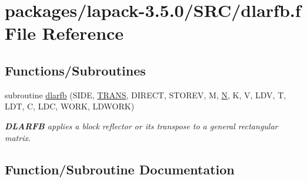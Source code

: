 \hypertarget{dlarfb_8f}{}\section{packages/lapack-\/3.5.0/\+S\+R\+C/dlarfb.f File Reference}
\label{dlarfb_8f}
\subsection*{Functions/\+Subroutines}
\begin{DoxyCompactItemize}
\item 
subroutine \hyperlink{dlarfb_8f_a83c81583bd444e0cf021fb006cd9a5e8}{dlarfb} (S\+I\+D\+E, \hyperlink{superlu__enum__consts_8h_a0c4e17b2d5cea33f9991ccc6a6678d62a1f61e3015bfe0f0c2c3fda4c5a0cdf58}{T\+R\+A\+N\+S}, D\+I\+R\+E\+C\+T, S\+T\+O\+R\+E\+V, M, \hyperlink{polmisc_8c_a0240ac851181b84ac374872dc5434ee4}{N}, K, V, L\+D\+V, T, L\+D\+T, C, L\+D\+C, W\+O\+R\+K, L\+D\+W\+O\+R\+K)
\begin{DoxyCompactList}\small\item\em {\bfseries D\+L\+A\+R\+F\+B} applies a block reflector or its transpose to a general rectangular matrix. \end{DoxyCompactList}\end{DoxyCompactItemize}


\subsection{Function/\+Subroutine Documentation}
\hypertarget{dlarfb_8f_a83c81583bd444e0cf021fb006cd9a5e8}{}
